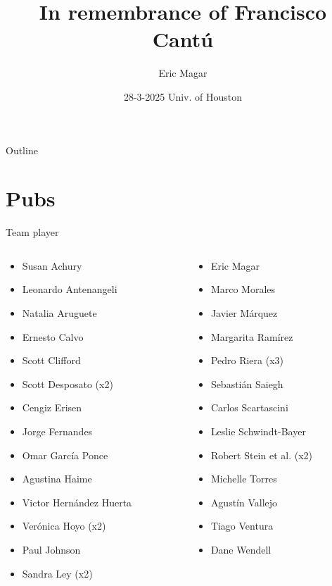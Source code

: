 \documentclass[bigger]{beamer}
\author{Eric Magar}
\date{28-3-2025 \newline Univ. of Houston}
\title{In remembrance of Francisco Cantú}
\begin{document}
\maketitle
\begin{frame}{Outline}
\tableofcontents
\end{frame}


\section{Pubs}
\label{sec:org4b2603b}
\begin{frame}[label={sec:orgf89d63b}]{Team player}
\begin{columns}
\begin{column}{0.5\columnwidth}
\begin{itemize}
\item Susan Achury
\item Leonardo Antenangeli
\item Natalia Aruguete
\item Ernesto Calvo
\item Scott Clifford
\item Scott Desposato (x2)
\item Cengiz Erisen
\item Jorge Fernandes
\item Omar García Ponce
\item Agustina Haime
\item Victor Hernández Huerta
\item Verónica Hoyo (x2)
\item Paul Johnson
\item Sandra Ley (x2)
\end{itemize}
\end{column}
\begin{column}{0.5\columnwidth}
\begin{itemize}
\item Eric Magar
\item Marco Morales
\item Javier Márquez
\item Margarita Ramírez
\item Pedro Riera (x3)
\item Sebastián Saiegh
\item Carlos Scartascini
\item Leslie Schwindt-Bayer
\item Robert Stein et al. (x2)
\item Michelle Torres
\item Agustín Vallejo
\item Tiago Ventura
\item Dane Wendell
\end{itemize}
\end{column}
\end{columns}
\end{frame}
\end{document}
